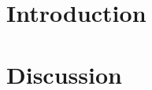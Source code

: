 \documentclass[aps,prl,twocolumn,superscriptaddress]{revtex4-2}
\begin{document}
\section{Introduction}
\label{sec:introduction}















\section{Discussion}
\label{sec:discussion}
\end{document}
